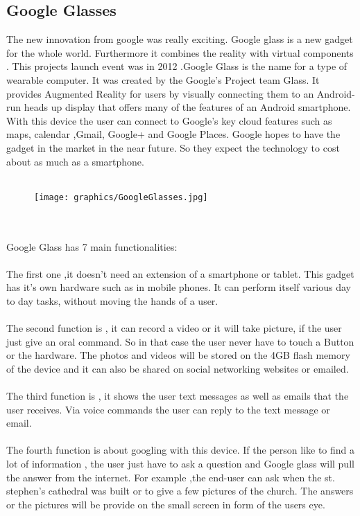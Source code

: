  \subsection{Google Glasses}
 The new innovation from google was really exciting. Google glass is a new gadget for the whole world. Furthermore it combines the reality with virtual components . This projects launch event was in 2012 .Google Glass is the name for a type of wearable computer. It was created by the Google's Project team Glass. It provides Augmented Reality for users by visually connecting them to an Android-run heads up display that offers many of the features of an Android smartphone. With this device the user can connect to Google's key cloud features such as maps, calendar ,Gmail, Google+ and Google Places. Google hopes to have the gadget in the market in the near future. So they expect the technology to cost about as much as a smartphone.\cite{glasses01}
 \\
 \\
 \begin{figure}[htbp]
 \centering
 \texttt{[image: graphics/GoogleGlasses.jpg]}
 \caption{\cite{glasses01}}
 \end{figure}
 \\
 \\
 Google Glass has 7 main functionalities\cite{functionsglasses}:
 \\
 \\
 The first one ,it doesn't need an extension of a smartphone or tablet. This gadget has it's own hardware such as in mobile phones. It can perform itself various day to day tasks, without moving the hands of a user. 
 \\
 \\
 The second function is , it can record a video or it will take picture, if the user just give an oral command. So in that case the user never have to touch a Button or the hardware. The photos and videos will be stored on the 4GB flash memory of the device and it can also be shared on social networking websites or emailed.
 \\
 \\
 The third function is , it shows the user text messages as well as emails that the user receives. Via voice commands the user can reply to the text message or email.
 \\
 \\
 The fourth function is about googling with this device. If the person like to find a lot of information , the user just have to ask a question and Google glass will pull the answer from the internet. For example ,the end-user can ask when the st. stephen's cathedral was built or to give a few pictures of the church. The answers or the pictures will be provide on the small screen in form of the users eye.

